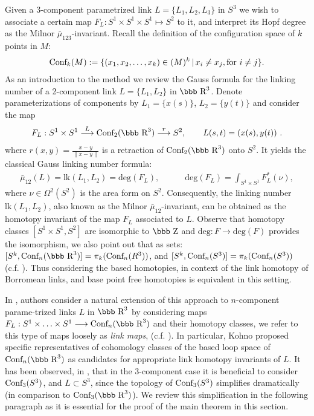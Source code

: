 \documentclass[12pt]{article}
\numberwithin{equation}{section}
\newcommand{\R}{\mbox{\bbb R}}       %
\newcommand{\Z}{\mbox{\bbb Z}}
\newcommand{\Cnf}{\text{\rm Conf}}
\newcommand{\no}{\noindent}
\begin{document}
\no Given a 3-component parametrized link $L=\{L_1,L_2,L_3\}$ in $S^3$
we wish to associate a certain map $F_L:S^1\times S^1\times S^1\mapsto S^2$ to it, and interpret its Hopf degree as the Milnor $\bar{\mu}_{123}$-invariant. Recall the definition of the configuration space of $k$ points in $M$:
\begin{gather*}
 \Cnf_k(M):=\{(x_1,x_2,\ldots, x_k)\in (M)^k\,|\,x_i\neq x_j,\text{for}\ i\neq j\}.
\end{gather*}
As an introduction to the method we review the Gauss formula for the linking number of 
a 2-component link $L=\{L_1, L_2\}$ in $\R^3$. Denote parameterizations 
of components by  $L_1=\{x(s)\}$, $L_2=\{y(t)\}$ and consider the map
\begin{gather*}
 F_L:S^1\times S^1\stackrel{L}{\longrightarrow} \Cnf_2(\R^3) \stackrel{r}{\longrightarrow} S^2,\qquad L(s,t)=(x(s), y(t))\ .
\end{gather*}
where $r(x,y)=\frac{x-y}{\|x-y\|}$ is a retraction of $\Cnf_2(\R^3)$ onto $S^2$.
It yields the classical Gauss linking number formula:
\begin{gather*}
 \bar{\mu}_{12}(L)=\text{lk}(L_1,L_2)=\text{deg}(F_L),\qquad\quad \text{deg}(F_L)=\int_{S^1\times S^1} F^\ast_L(\nu),
\end{gather*}
where $\nu\in \Omega^2(S^2)$ is the 
area form on $S^2$. Consequently, the linking number $\text{lk}(L_1,L_2)$,
also known as the Milnor $\bar{\mu}_{12}$-invariant, can be obtained as the homotopy invariant of the map $F_L$ associated to $L$. 
Observe that homotopy classes $[S^1\times S^1,S^2]$ are 
isomorphic to $\Z$ and $\text{deg}:F\rightarrow \text{deg}(F)$ provides the isomorphism,
we also point out that as sets: $[S^k,\Cnf_n(\R^3)]=\pi_k(\Cnf_n(R^3))$, and $[S^k,\Cnf_n(S^3)]=\pi_k(\Cnf_n(S^3))$ (c.f. \cite[p. 421]{Hatcher02}). Thus considering the based homotopies, in context of the link homotopy of Borromean links, and base point free homotopies is equivalent in this setting.

In \cite{Kohno02, Koschorke97},
authors consider a natural extension of this approach to $n$-component parame-trized links $L$ in $\R^3$ by considering maps $F_L:S^1\times\ldots\times S^1\longrightarrow \Cnf_n(\R^3)$ and their homotopy classes, we refer to this type of maps loosely as \emph{link maps}, (c.f. \cite{Koschorke97}). In particular, Kohno \cite{Kohno02} proposed specific representatives of cohomology classes of the based loop space of $\Cnf_n(\R^3)$ as candidates for appropriate link homotopy invariants of $L$. It has been observed, in \cite{Deturck-Gluck-Melvin-Shonkwiler08}, that in the $3$-component case it is  beneficial to consider $\Cnf_3(S^3)$, and $L\subset S^3$, since the topology of $\Cnf_3(S^3)$ simplifies dramatically (in comparison to $\Cnf_3(\R^3)$). We review this simplification in the following paragraph as it is essential for the proof of the main theorem in this section.
\end{document}
